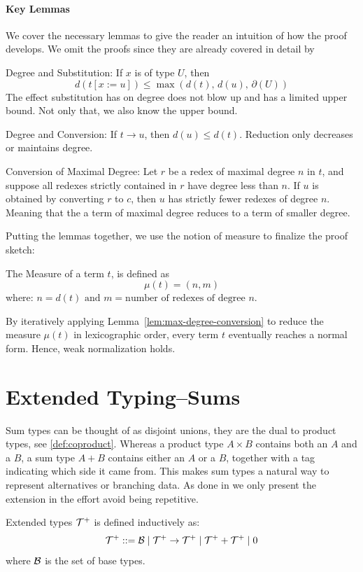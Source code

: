 \paragraph{Key Lemmas}{We cover the necessary lemmas to give the reader an intuition of how the proof develops. We omit the proofs since they are already covered in detail by \cite{girard1989:proofs-and-types}
}
\begin{lemma} Degree and Substitution:
\label{lem:degree-substitution}
If $x$ is of type $U$, then
\[
  d(t[x := u]) \leq \max(d(t),\, d(u),\, \partial(U))
\]
The effect substitution has on degree does not blow up and has a limited upper bound. Not only that, we also know the upper bound.
\end{lemma}
\begin{lemma} Degree and Conversion:
\label{lem:degree-conversion}
If $t \to u$, then
\(
d(u) \le d(t)
\).
Reduction only decreases or maintains degree.
\end{lemma}
\begin{lemma} Conversion of Maximal Degree:
\label{lem:max-degree-conversion}
Let $r$ be a redex of maximal degree $n$ in $t$, and suppose all redexes strictly contained in $r$ have degree less than $n$. If $u$ is obtained by converting $r$ to $c$, then $u$ has strictly fewer redexes of degree $n$. Meaning that the a term of maximal degree reduces to a term of smaller degree.
\end{lemma}
Putting the lemmas together, we use the notion of measure to finalize the proof sketch:
\begin{definition} The Measure of a term
\label{def:term-measure}
$t$, is defined as
\[
  \mu(t) = (n, m)
\]
where: \( n = d(t) \text{ and  } m = \text{number of redexes of degree } n. \)
\end{definition}
\begin{theorem}
\label{thm:weak-normalisation} By iteratively applying Lemma~\ref{lem:max-degree-conversion} to reduce the measure $\mu(t)$ in lexicographic order, every term $t$ eventually reaches a normal form. Hence, weak normalization holds.
\end{theorem}
\section{\centering Extended Typing--Sums}
Sum types can be thought of as disjoint unions, they are the dual to product types, see \ref{def:coproduct}. Whereas a product type $A \times B$ contains both an $A$ and a $B$, a sum type $A + B$ contains either an $A$ or a $B$, together with a tag indicating which side it came from. This makes sum types a natural way to represent alternatives or branching data. As done in \cite{selinger2008:lambdanotes} we only present the extension in the effort avoid being repetitive.
\begin{definition} 
Extended types $ \mathcal{T}^+ $ is defined inductively as:
\[
  \mathcal{T}^+ ::= \mathcal{B} \mid \mathcal{T}^+ \to \mathcal{T}^+ \mid \mathcal{T}^+ + \mathcal{T}^+ \mid 0
\]
where $\mathcal{B}$ is the set of base types.
\end{definition}

